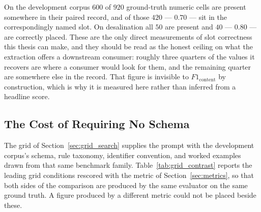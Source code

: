 \documentclass[11pt]{article}
\begin{document}
On the development corpus $600$ of $920$ ground-truth numeric cells are present
somewhere in their paired record, and of those $420$ --- $0.70$ --- sit in the
correspondingly named slot. On desalination all $50$ are present and $40$ ---
$0.80$ --- are correctly placed. These are the only direct measurements of slot
correctness this thesis can make, and they should be read as the honest ceiling
on what the extraction offers a downstream consumer: roughly three quarters of
the values it recovers are where a consumer would look for them, and the
remaining quarter are somewhere else in the record. That figure is invisible to
$F1_{\text{content}}$ by construction, which is why it is measured here rather
than inferred from a headline score.

\subsection{The Cost of Requiring No Schema}
\label{sec:results_grid}

The grid of Section~\ref{sec:grid_search} supplies the prompt with the
development corpus's schema, rule taxonomy, identifier convention, and worked
examples drawn from that same benchmark family. Table~\ref{tab:grid_contrast}
reports the leading grid conditions rescored with the metric of
Section~\ref{sec:metrics}, so that both sides of the comparison are produced by
the same evaluator on the same ground truth. A figure produced by a different
metric could not be placed beside these.
\end{document}
